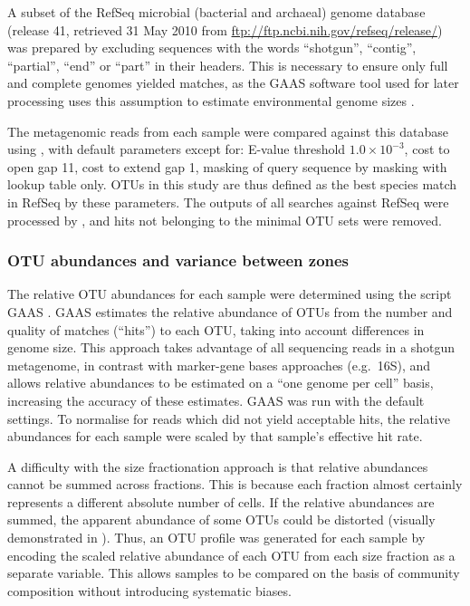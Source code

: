 A subset of the RefSeq microbial (bacterial and archaeal) genome database (release 41, retrieved 31 May 2010 from \url{ftp://ftp.ncbi.nih.gov/refseq/release/}) was prepared by excluding sequences with the words ``shotgun'', ``contig'', ``partial'', ``end'' or ``part'' in their headers.
This is necessary to ensure only full and complete genomes yielded matches, as the \ac{GAAS} software tool used for later processing uses this assumption to estimate environmental genome sizes \citep[following][]{Angly:2009ip}.

The metagenomic reads from each sample were compared against this database using , with default parameters except for: E-value threshold $1.0\times{}10^{-3}$, cost to open gap 11, cost to extend gap 1, masking of query sequence by  masking with lookup table only.
\acp{OTU} in this study are thus defined as the best species match in RefSeq by these parameters.
The outputs of all  searches against RefSeq were processed by , and hits not belonging to the minimal \ac{OTU} sets were removed.

\subsubsection{OTU abundances and variance between zones}

The relative \ac{OTU} abundances for each sample were determined using the  script \ac{GAAS} \cite{Angly:2009ip}.
\ac{GAAS} estimates the relative abundance of \acp{OTU} from the number and quality of  matches (``hits'') to each \ac{OTU}, taking into account differences in genome size. 
This approach takes advantage of all sequencing reads in a shotgun metagenome, in contrast with marker-gene bases approaches (e.g.\ 16S), and allows relative abundances to be estimated on a ``one genome per cell'' basis, increasing the accuracy of these estimates.
\ac{GAAS} was run with the default settings. 
To normalise for reads which did not yield acceptable hits, the relative abundances for each sample were scaled by that sample's effective  hit rate.

A difficulty with the size fractionation approach is that relative abundances cannot be summed across fractions.
This is because each fraction almost certainly represents a different absolute number of cells.
If the relative abundances are summed, the apparent abundance of some \acp{OTU} could be distorted (visually demonstrated in ).
Thus, an \ac{OTU} profile was generated for each sample by encoding the scaled relative abundance of each \ac{OTU} from each size fraction as a separate variable.
This allows samples to be compared on the basis of community composition without introducing systematic biases.

